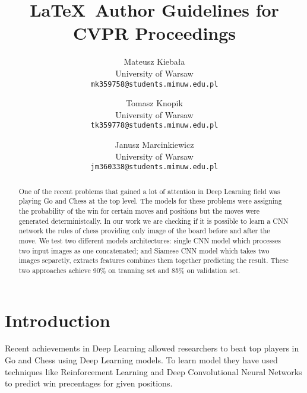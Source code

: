 \documentclass[10pt,twocolumn,letterpaper]{article}
\begin{document}
\title{\LaTeX\ Author Guidelines for CVPR Proceedings}

\author{Mateusz Kiebała\\
University of Warsaw\\
{\tt\small mk359758@students.mimuw.edu.pl}
\and
Tomasz Knopik\\
University of Warsaw\\
{\tt\small tk359778@students.mimuw.edu.pl}
\and
Janusz Marcinkiewicz\\
University of Warsaw\\
{\tt\small jm360338@students.mimuw.edu.pl}}

\maketitle

\begin{abstract}
   One of the recent problems that gained a lot of attention in Deep Learning
   field was playing Go and Chess at the top level. The models for these
   problems were assigning the probability of the win for certain moves and
   positions but the moves were generated deterministcally. In our work we are
   checking if it is possible to learn a CNN network the rules of chess
   providing only image of the board before and after the move. We test two
   different models architectures: single CNN model which processes two input
   images as one concatenated; and Siamese CNN model which takes two images
   separetly, extracts features combines them together predicting the result.
   These two approaches achieve 90\% on tranning set and 85\% on validation set.
\end{abstract}

\section{Introduction}

Recent achievements in Deep Learning allowed researchers to beat top players in
Go and Chess using Deep Learning models. To learn model they have used
techniques like Reinforcement Learning and Deep Convolutional Neural Networks to
predict win precentages for given positions.
\end{document}
